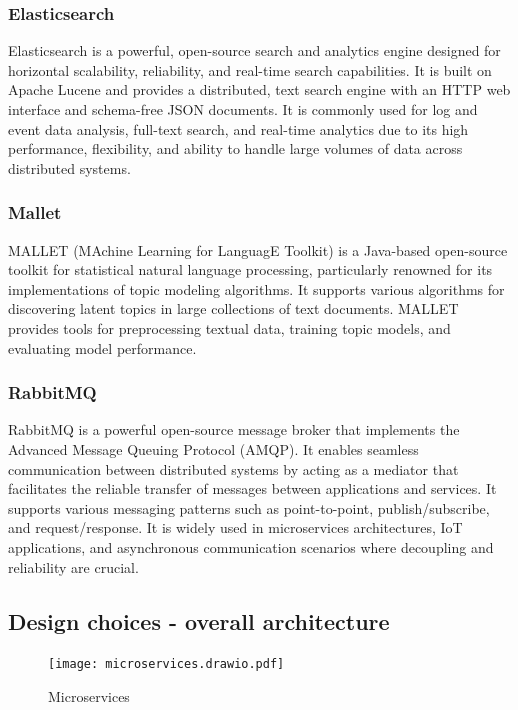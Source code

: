 \subsubsection{Elasticsearch}
Elasticsearch is a powerful, open-source search and analytics engine designed for horizontal scalability,
reliability, and real-time search capabilities. It is built on Apache Lucene and provides a distributed, text
search engine with an HTTP web interface and schema-free JSON documents. It is commonly used for log and event
data analysis, full-text search, and real-time analytics due to its high performance, flexibility, and ability
to handle large volumes of data across distributed systems. \cite{elastic}

\subsubsection{Mallet}
MALLET (MAchine Learning for LanguagE Toolkit) is a Java-based open-source toolkit for statistical natural
language processing, particularly renowned for its implementations of topic modeling algorithms. It supports
various algorithms for discovering latent topics in large collections of text documents. MALLET provides tools
for preprocessing textual data, training topic models, and evaluating model performance. \cite{mallet}

\subsubsection{RabbitMQ}
RabbitMQ is a powerful open-source message broker that implements the Advanced Message Queuing Protocol (AMQP).
It enables seamless communication between distributed systems by acting as a mediator that facilitates the
reliable transfer of messages between applications and services. It supports various messaging patterns such
as point-to-point, publish/subscribe, and request/response. It is widely used in microservices architectures,
IoT applications, and asynchronous communication scenarios where decoupling and reliability are crucial.
\cite{rabbitmq}

\clearpage


\subsection{Design choices - overall architecture}
\begin{figure}[ht]
    \centering
    \texttt{[image: microservices.drawio.pdf]}
    \caption{Microservices}
    \label{fig:microservices}
\end{figure}


